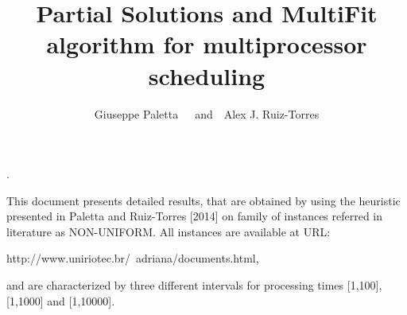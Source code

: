 \documentclass[12pt,a4paper]{article}
\title{\bf
Partial Solutions and MultiFit algorithm for multiprocessor
scheduling}
\author{Giuseppe Paletta\footnotemark[1]~~~and~~Alex J. Ruiz-Torres \footnotemark[2]}
\begin{document}
\maketitle

\renewcommand{\thefootnote}{\fnsymbol{footnote}}

. 
\renewcommand{\thefootnote}{\fnsymbol{footnote}}

This document presents detailed results, that are obtained by using
the heuristic presented in Paletta and Ruiz-Torres [2014] on family
of instances referred in literature as NON-UNIFORM.  All instances
are available at URL:
\begin{center}
http://www.uniriotec.br/~adriana/documents.html,
\end{center}
and are characterized by three different intervals for processing
times [1,100], [1,1000] and [1,10000].
\end{document}
